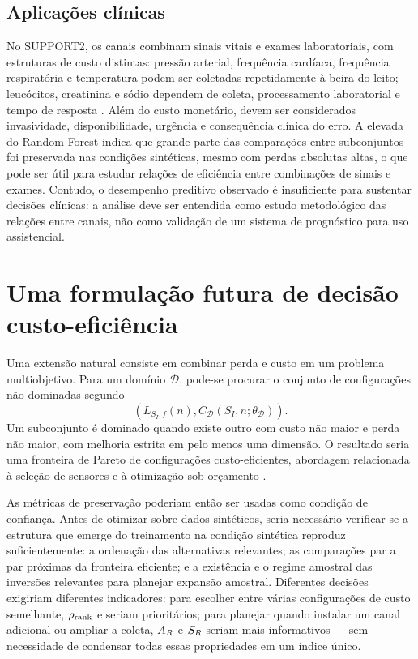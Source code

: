 \subsection{Aplicações clínicas}

No SUPPORT2, os canais combinam sinais vitais e exames laboratoriais, com estruturas de custo distintas: pressão arterial, frequência cardíaca, frequência respiratória e temperatura podem ser coletadas repetidamente à beira do leito; leucócitos, creatinina e sódio dependem de coleta, processamento laboratorial e tempo de resposta \cite{support1995,knaus1995}. Além do custo monetário, devem ser considerados invasividade, disponibilidade, urgência e consequência clínica do erro. A elevada \WinnersAgreement{} do Random Forest indica que grande parte das comparações entre subconjuntos foi preservada nas condições sintéticas, mesmo com perdas absolutas altas, o que pode ser útil para estudar relações de eficiência entre combinações de sinais e exames. Contudo, o desempenho preditivo observado é insuficiente para sustentar decisões clínicas: a análise deve ser entendida como estudo metodológico das relações entre canais, não como validação de um sistema de prognóstico para uso assistencial.

\section{Uma formulação futura de decisão custo-eficiência}

Uma extensão natural consiste em combinar perda e custo em um problema multiobjetivo. Para um domínio $\mathcal{D}$, pode-se procurar o conjunto de configurações não dominadas segundo
\[
\left(
  \overline{L}_{S_I,f}(n),
  C_{\mathcal{D}}(S_I,n;\theta_{\mathcal{D}})
\right).
\]
Um subconjunto é dominado quando existe outro com custo não maior e perda não maior, com melhoria estrita em pelo menos uma dimensão. O resultado seria uma fronteira de Pareto de configurações custo-eficientes, abordagem relacionada à seleção de sensores e à otimização sob orçamento \cite{joshi2009,krause2008}.

As métricas de preservação poderiam então ser usadas como condição de confiança. Antes de otimizar sobre dados sintéticos, seria necessário verificar se a estrutura que emerge do treinamento na condição sintética reproduz suficientemente: a ordenação das alternativas relevantes; as comparações par a par próximas da fronteira eficiente; e a existência e o regime amostral das inversões relevantes para planejar expansão amostral. Diferentes decisões exigiriam diferentes indicadores: para escolher entre várias configurações de custo semelhante, $\rho_{\mathrm{rank}}$ e \WinnersAgreement{} seriam prioritários; para planejar quando instalar um canal adicional ou ampliar a coleta, $A_R$ e $S_R$ seriam mais informativos --- sem necessidade de condensar todas essas propriedades em um índice único.


